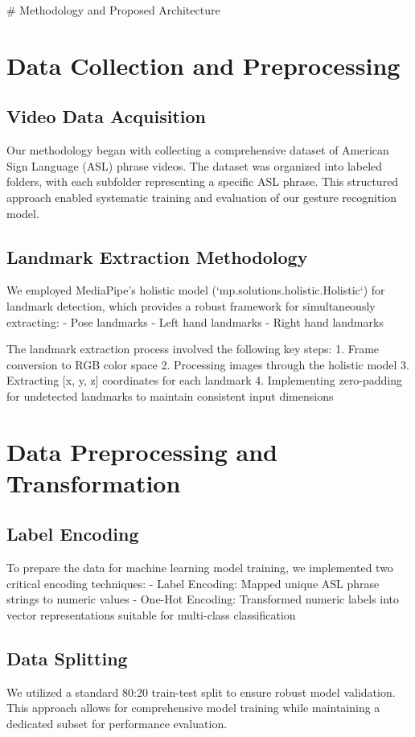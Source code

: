 # Methodology and Proposed Architecture

\section{Data Collection and Preprocessing}

\subsection{Video Data Acquisition}
Our methodology began with collecting a comprehensive dataset of American Sign Language (ASL) phrase videos. The dataset was organized into labeled folders, with each subfolder representing a specific ASL phrase. This structured approach enabled systematic training and evaluation of our gesture recognition model.

\subsection{Landmark Extraction Methodology}
We employed MediaPipe's holistic model (`mp.solutions.holistic.Holistic`) for landmark detection, which provides a robust framework for simultaneously extracting:
- Pose landmarks
- Left hand landmarks
- Right hand landmarks

The landmark extraction process involved the following key steps:
1. Frame conversion to RGB color space
2. Processing images through the holistic model
3. Extracting [x, y, z] coordinates for each landmark
4. Implementing zero-padding for undetected landmarks to maintain consistent input dimensions

\section{Data Preprocessing and Transformation}

\subsection{Label Encoding}
To prepare the data for machine learning model training, we implemented two critical encoding techniques:
- Label Encoding: Mapped unique ASL phrase strings to numeric values
- One-Hot Encoding: Transformed numeric labels into vector representations suitable for multi-class classification

\subsection{Data Splitting}
We utilized a standard 80:20 train-test split to ensure robust model validation. This approach allows for comprehensive model training while maintaining a dedicated subset for performance evaluation.

